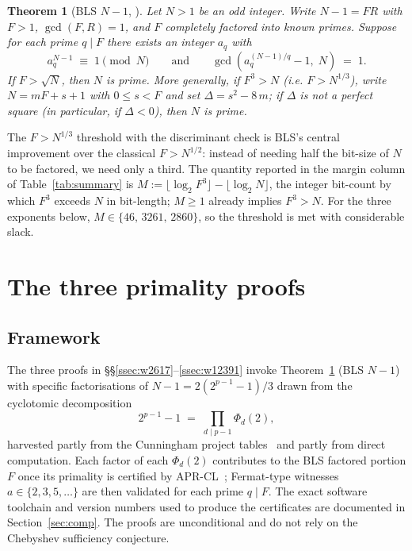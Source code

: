 \documentclass[11pt,a4paper]{amsart}
\theoremstyle{plain}
\newtheorem{theorem}{Theorem}[section]
\theoremstyle{definition}
\begin{document}
\begin{theorem}[{BLS $N-1$, \cite[Theorem~5 and Theorem~11]{BLS75}}]
\label{thm:BLSN-1}
Let $N > 1$ be an odd integer. Write $N - 1 = F R$ with $F > 1$,
$\gcd(F, R) = 1$, and $F$ completely factored into known primes.
Suppose for each prime $q \mid F$ there exists an integer $a_q$ with
\[
  a_q^{N-1} \;\equiv\; 1 \pmod N \qquad\text{and}\qquad
  \gcd(a_q^{(N-1)/q} - 1,\; N) \;=\; 1.
\]
If $F > \sqrt N$, then $N$ is prime. More generally, if $F^3 > N$ (i.e.
$F > N^{1/3}$), write $N = m F + s + 1$ with $0 \leq s < F$ and set
$\Delta = s^2 - 8\, m$; if $\Delta$ is not a perfect square
(in particular, if $\Delta < 0$), then $N$ is prime.
\end{theorem}

The $F > N^{1/3}$ threshold with the discriminant check is BLS's
central improvement over the classical $F > N^{1/2}$: instead of
needing half the bit-size of $N$ to be factored, we need only a third.
The quantity reported in the margin column of
Table~\ref{tab:summary} is
$M := \lfloor \log_2 F^3 \rfloor - \lfloor \log_2 N \rfloor$,
the integer bit-count by which $F^3$ exceeds $N$ in bit-length; $M
\geq 1$ already implies $F^3 > N$. For the three exponents below,
$M \in \{46,\, 3261,\, 2860\}$, so the threshold is met with
considerable slack.

\section{The three primality proofs}
\label{sec:proofs}

\subsection{Framework}

The three proofs in \S\S\ref{ssec:w2617}--\ref{ssec:w12391} invoke
Theorem~\ref{thm:BLSN-1} (BLS $N - 1$) with specific factorisations of
$N - 1 = 2(2^{p-1} - 1)/3$ drawn from the cyclotomic decomposition
\[
  2^{p-1} - 1 \;=\; \prod_{d \mid p - 1} \Phi_d(2),
\]
harvested partly from the Cunningham project tables~\cite{Cunningham}
and partly from direct computation. Each factor of each $\Phi_d(2)$
contributes to the BLS factored portion $F$ once its primality
is certified by APR-CL~\cite{APR,CohenLenstraAlgo}; Fermat-type witnesses
$a \in \{2, 3, 5, \ldots\}$ are then validated for each prime $q \mid
F$. The exact software toolchain and version numbers used to produce
the certificates are documented in Section~\ref{sec:comp}. The proofs
are unconditional and do not rely on the Chebyshev sufficiency
conjecture.
\end{document}
